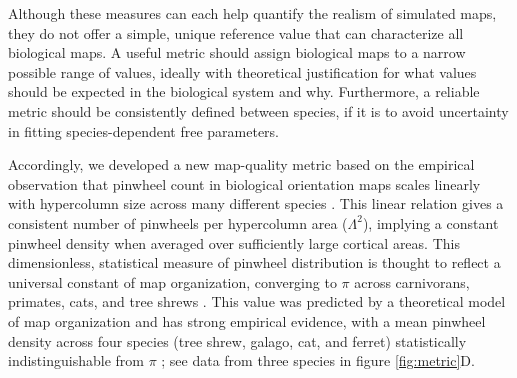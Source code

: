 \documentclass{article}
\begin{document}
Although these measures can each help quantify the realism of simulated
maps, they do not offer a simple, unique reference value that can
characterize all biological maps.  A useful metric should assign
biological maps to a narrow possible range of values, ideally with
theoretical justification for what values should be expected in the
biological system and why. Furthermore, a reliable metric should be
consistently defined between species, if it is to avoid uncertainty in
fitting species-dependent free parameters.

Accordingly, we developed a new map-quality metric based on the
empirical observation that pinwheel count in biological orientation maps
scales linearly with hypercolumn size across many different species
\citep{Kaschube2010}. This linear relation gives a consistent number
of pinwheels per hypercolumn area ($\Lambda^2$), implying a constant
pinwheel density when averaged over sufficiently large cortical
areas. This dimensionless, statistical measure of pinwheel
distribution is thought to reflect a universal constant of map
organization, converging to $\pi$ across carnivorans, primates, cats,
and tree shrews \citep{Kaschube2010,Keil2012}. This value was
predicted by a theoretical model of map organization and has strong
empirical evidence, with a mean pinwheel density across four species
(tree shrew, galago, cat, and ferret) statistically indistinguishable
from $\pi$ \citep{Kaschube2010}; see data from three species in figure
\ref{fig:metric}D.
\end{document}
